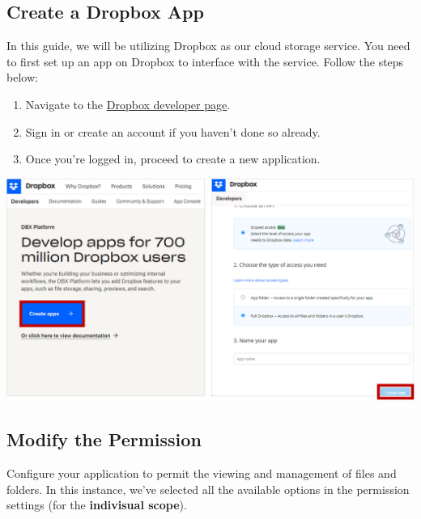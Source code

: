 \documentclass[
  letterpaper,
]{scrbook}
\providecommand{\tightlist}{%
  \setlength{\itemsep}{0pt}\setlength{\parskip}{0pt}}\usepackage{longtable,booktabs,array}
\begin{document}
\hypertarget{create-a-dropbox-app}{%
\subsection{Create a Dropbox App}\label{create-a-dropbox-app}}

In this guide, we will be utilizing Dropbox as our cloud storage
service. You need to first set up an app on Dropbox to interface with
the service. Follow the steps below:

\begin{enumerate}
\def\labelenumi{\arabic{enumi}.}
\tightlist
\item
  Navigate to the \href{https://www.dropbox.com/developers/}{Dropbox
  developer page}.
\item
  Sign in or create an account if you haven't done so already.
\item
  Once you're logged in, proceed to create a new application.
\end{enumerate}

\includegraphics{content/material/ch2/dropbox_create.png}

\hypertarget{modify-the-permission}{%
\subsection{Modify the Permission}\label{modify-the-permission}}

Configure your application to permit the viewing and management of files
and folders. In this instance, we've selected all the available options
in the permission settings (for the \textbf{indivisual scope}).
\end{document}
